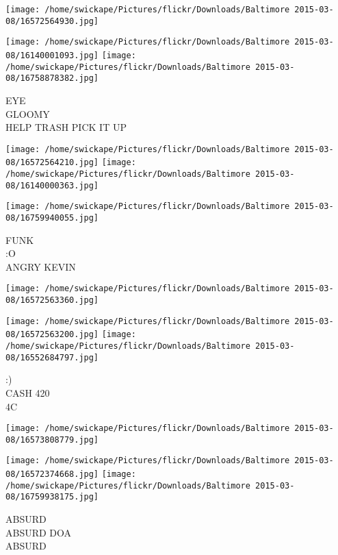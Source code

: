 \documentclass[10pt,letterpaper]{article}
\begin{document}
\texttt{[image: /home/swickape/Pictures/flickr/Downloads/Baltimore 2015-03-08/16572564930.jpg]}

\vspace{0.25in}
\texttt{[image: /home/swickape/Pictures/flickr/Downloads/Baltimore 2015-03-08/16140001093.jpg]}
\texttt{[image: /home/swickape/Pictures/flickr/Downloads/Baltimore 2015-03-08/16758878382.jpg]}

EYE\\
GLOOMY\\
HELP TRASH PICK IT UP\\
\pagebreak

\texttt{[image: /home/swickape/Pictures/flickr/Downloads/Baltimore 2015-03-08/16572564210.jpg]}
\texttt{[image: /home/swickape/Pictures/flickr/Downloads/Baltimore 2015-03-08/16140000363.jpg]}

\texttt{[image: /home/swickape/Pictures/flickr/Downloads/Baltimore 2015-03-08/16759940055.jpg]}

FUNK\\
:O\\
ANGRY KEVIN\\
\pagebreak

\texttt{[image: /home/swickape/Pictures/flickr/Downloads/Baltimore 2015-03-08/16572563360.jpg]}

\vspace{0.25in}
\texttt{[image: /home/swickape/Pictures/flickr/Downloads/Baltimore 2015-03-08/16572563200.jpg]}
\texttt{[image: /home/swickape/Pictures/flickr/Downloads/Baltimore 2015-03-08/16552684797.jpg]}

:)\\
CASH 420\\
4C\\
\pagebreak

\texttt{[image: /home/swickape/Pictures/flickr/Downloads/Baltimore 2015-03-08/16573808779.jpg]}

\vspace{0.25in}
\texttt{[image: /home/swickape/Pictures/flickr/Downloads/Baltimore 2015-03-08/16572374668.jpg]}
\texttt{[image: /home/swickape/Pictures/flickr/Downloads/Baltimore 2015-03-08/16759938175.jpg]}

ABSURD\\
ABSURD DOA\\
ABSURD\\
\pagebreak
\end{document}
